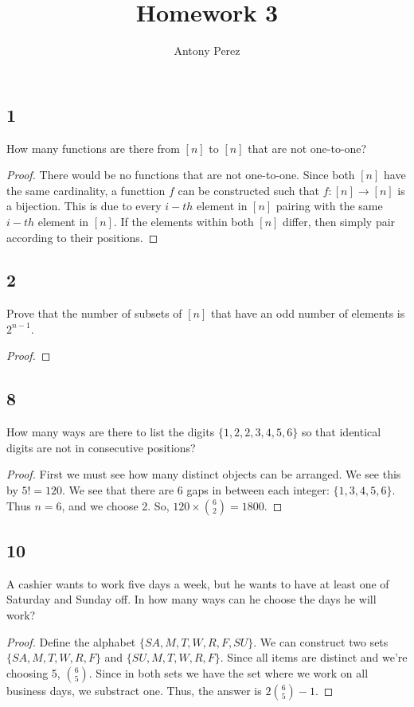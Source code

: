 \documentclass{amsart}
\title{Homework 3}
\author{Antony Perez}
\begin{document}
\maketitle
\subsection*{1} How many functions are there from $[n]$ to $[n]$ that are not one-to-one?
\begin{proof}
    There would be no functions that are not one-to-one. Since both $[n]$ have the same cardinality, a functtion $f$ can be constructed such that $f: [n] \to [n]$ is a bijection. This is due to every $i-th$ element in $[n]$ pairing with the same $i-th$ element in $[n]$. If the elements within both $[n]$ differ, then simply pair according to their positions.
\end{proof}
\subsection*{2} Prove that the number of subsets of $[n]$ that have an odd number of elements is $2^{n-1}$.
\begin{proof}
   
\end{proof}
\subsection*{8} How many ways are there to list the digits $\{1,2,2,3,4,5,6\}$ so that identical digits are not in consecutive positions?
\begin{proof}
    First we must see how many distinct objects can be arranged. We see this by $5! = 120$. We see that there are 6 gaps in between each integer: $\{1,3,4,5,6\}$. Thus $n=6$, and we choose 2. So, $120 \times \binom{6}{2} = 1800$.
\end{proof}
\subsection*{10} A cashier wants to work five days a week, but he wants to have at least one of Saturday and Sunday off. In how many ways can he choose the days he will work?
\begin{proof}
    Define the alphabet $\{SA, M , T, W , R , F, SU\}$. We can construct two sets $\{SA, M, T , W, R, F\}$ and $\{SU, M,T,W,R,F\}$. Since all items are distinct and we're choosing 5, $\binom{6}{5}.$ Since in both sets we have the set where we work on all business days, we substract one. Thus, the answer is $2\binom{6}{5}-1$.
\end{proof}
\end{document}
